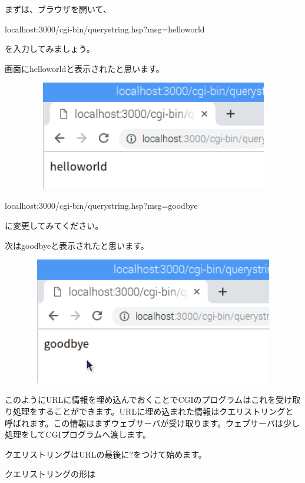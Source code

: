 \documentclass[a4paper,12pt,dvipdfmx]{jarticle}
\begin{document}
\bigskip

まずは、ブラウザを開いて、

localhost:3000/cgi-bin/querystring.hsp?msg=helloworld

を入力してみましょう。

%


画面にhelloworldと表示されたと思います。



\centering
\includegraphics[width=15.528cm,height=4.775cm]{ome7-img053.png}
\flushleft

localhost:3000/cgi-bin/querystring.hsp?msg=goodbye

に変更してみてください。

%


次はgoodbyeと表示されたと思います。

\centering
\includegraphics[width=15.494cm,height=5.546cm]{ome7-img054.png}
\flushleft

このようにURLに情報を埋め込んでおくことでCGIのプログラムはこれを受け取り処理をすることができます。URLに埋め込まれた情報はクエリストリングと呼ばれます。この情報はまずウェブサーバが受け取ります。ウェブサーバは少し処理をしてCGIプログラムへ渡します。

クエリストリングはURLの最後に?をつけて始めます。

クエリストリングの形は
\end{document}
